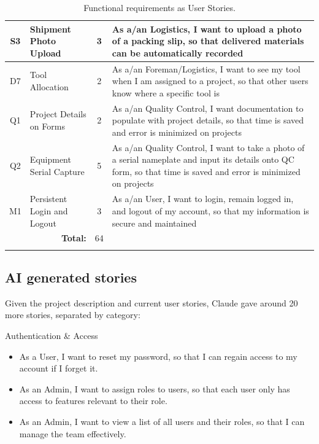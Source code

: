 \documentclass{article}
\begin{document}
\begin{longtable}[h]{c l c p{10cm}}
S3 & Shipment Photo Upload & 3 & As a/an Logistics, I want to upload a photo of a packing slip, so that delivered materials can be automatically recorded \\ \hline
D7 & Tool Allocation & 2 & As a/an Foreman/Logistics, I want to see my tool when I am assigned to a project, so that other users know where a specific tool is \\ \hline
Q1 & Project Details on Forms &	2 & As a/an Quality Control, I want documentation to populate with project details, so that time is saved and error is minimized on projects \\ \hline
Q2 & Equipment Serial Capture &	5 & As a/an Quality Control, I want to take a photo of a serial nameplate and input its details onto QC form, so that time is saved and error is minimized on projects \\ \hline
M1 & Persistent Login and Logout & 3 & As a/an User, I want to login, remain logged in, and logout of my account, so that my information is secure and maintained \\ \hline

\multicolumn{2}{r}{\bf Total: } & 64 & \\ \hline

\caption{Functional requirements as User Stories.}\label{tab:functional-req}
\end{longtable}

\subsection{AI generated stories}
Given the project description and current user stories, Claude gave around 20 more stories, separated by category:

Authentication & Access
\begin{itemize}
    \item As a User, I want to reset my password, so that I can regain access to my account if I forget it.
    \item As an Admin, I want to assign roles to users, so that each user only has access to features relevant to their role.
    \item As an Admin, I want to view a list of all users and their roles, so that I can manage the team effectively.
\end{itemize}
\end{document}
